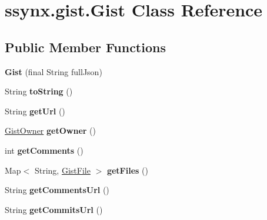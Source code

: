 \hypertarget{classssynx_1_1gist_1_1Gist}{}\section{ssynx.\+gist.\+Gist Class Reference}
\label{classssynx_1_1gist_1_1Gist}
\subsection*{Public Member Functions}
\begin{DoxyCompactItemize}
\item 
\mbox{\label{classssynx_1_1gist_1_1Gist_a19175d7069b11516bf3c954169893a72}} 
{\bfseries Gist} (final String full\+Json)
\item 
\mbox{\label{classssynx_1_1gist_1_1Gist_a1340e9c8355447729542e73a7e04fdbd}} 
String {\bfseries to\+String} ()
\item 
\mbox{\label{classssynx_1_1gist_1_1Gist_a13a8f07ac0a8f5161e60d1a2eca7db88}} 
String {\bfseries get\+Url} ()
\item 
\mbox{\label{classssynx_1_1gist_1_1Gist_a2b034270fe5a98d4a6e3729e98af1f1f}} 
\hyperlink{classssynx_1_1gist_1_1GistOwner}{Gist\+Owner} {\bfseries get\+Owner} ()
\item 
\mbox{\label{classssynx_1_1gist_1_1Gist_a53e0e451b78fc2262531fb56d4de6b61}} 
int {\bfseries get\+Comments} ()
\item 
\mbox{\label{classssynx_1_1gist_1_1Gist_aeeab076e9dd4c002f88450fadbd6e92a}} 
Map$<$ String, \hyperlink{classssynx_1_1gist_1_1GistFile}{Gist\+File} $>$ {\bfseries get\+Files} ()
\item 
\mbox{\label{classssynx_1_1gist_1_1Gist_ae4614d6259fe285173fad3f745c75401}} 
String {\bfseries get\+Comments\+Url} ()
\item 
\mbox{\label{classssynx_1_1gist_1_1Gist_a694d95de5f265762668e5f7b99f23c9e}} 
String {\bfseries get\+Commits\+Url} ()
\item 

\end{DoxyCompactItemize}
